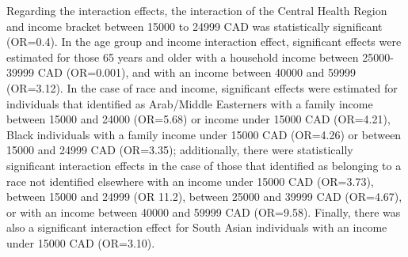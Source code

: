 \documentclass[
  letterpaper,
  DIV=11,
  numbers=noendperiod]{scrartcl}
\begin{document}
Regarding the interaction effects, the interaction of the Central Health
Region and income bracket between 15000 to 24999 CAD was statistically
significant (OR=0.4). In the age group and income interaction effect,
significant effects were estimated for those 65 years and older with a
household income between 25000-39999 CAD (OR=0.001), and with an income
between 40000 and 59999 (OR=3.12). In the case of race and income,
significant effects were estimated for individuals that identified as
Arab/Middle Easterners with a family income between 15000 and 24000
(OR=5.68) or income under 15000 CAD (OR=4.21), Black individuals with a
family income under 15000 CAD (OR=4.26) or between 15000 and 24999 CAD
(OR=3.35); additionally, there were statistically significant
interaction effects in the case of those that identified as belonging to
a race not identified elsewhere with an income under 15000 CAD
(OR=3.73), between 15000 and 24999 (OR 11.2), between 25000 and 39999
CAD (OR=4.67), or with an income between 40000 and 59999 CAD (OR=9.58).
Finally, there was also a significant interaction effect for South Asian
individuals with an income under 15000 CAD (OR=3.10).
\end{document}
